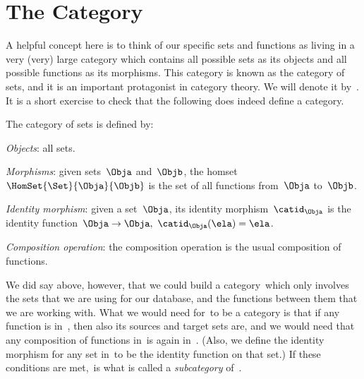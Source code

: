 
\section{The Category \Set}

A helpful concept here is to think of our specific sets and functions as living in a very (very) large category which contains all possible sets as its objects and all possible functions as its morphisms.
This category is known as the category of sets, and it is an important protagonist in category theory.
We will denote it by~\Set.
It is a short exercise to check that the following does indeed define a category.

\begin{ctdefinition}
    \label{def:Set}
    The category of sets \iindex{\Set} is defined by:
    \begin{compactenum}
        \item \emph{Objects}: all sets.
        \item \emph{Morphisms}: given sets~$\Obja$ and~$\Objb$, the homset~$\HomSet{\Set}{\Obja}{\Objb}$ is the set of all functions from~$\Obja$ to~$\Objb$.
        \item \emph{Identity morphism}: given a set~$\Obja$, its identity morphism~$\catid_\Obja$ is the identity function~$\Obja \to \Obja, \ \catid_\Obja(\ela) = \ela$.
        \item \emph{Composition operation}: the composition operation is the usual composition of functions.
    \end{compactenum}
\end{ctdefinition}

We did say above, however, that we could build a category~\Database which only involves the sets that we are using for our database, and the functions between them that we are working with.
What we would need for~\Database to be a category is that if any function is in~\Database, then also its sources and target sets are, and we would need that any composition of functions in~\Database is again in~\Database. (Also, we define the identity morphism for any set in~\Database to be the identity function on that set.) If these conditions are met,~\Database is what is called a \emph{subcategory} of~\Set.
